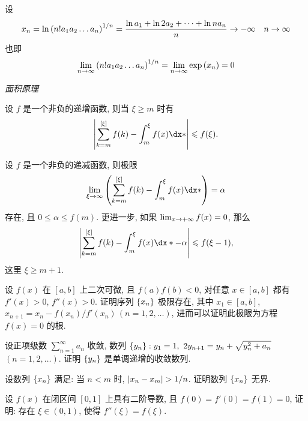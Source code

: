 \begin{exercise}[series=exer]
\begin{answer}
    设 
    \begin{align*}
        x_n = \ln \qty(n! a_{1} a_{2} \dots a_{n})^{1/n} = \frac{\ln{a_1}+\ln{2a_2}+\cdots+\ln{na_n}}{n} \to -\infty \quad n\to \infty
    \end{align*}
    也即
    \begin{align*}
        \lim_{n \to \infty}\qty(n! a_{1} a_{2} \dots a_{n})^{1/n} = \lim_{n \to \infty}\exp{(x_n)} = 0
    \end{align*}
  \end{answer}
  \item \emph{面积原理}
  \begin{exercise}
      \item 设 $ f $ 是一个非负的递增函数, 则当 $ \xi \ge m $ 时有
      \begin{align*}
          \abs{\sum_{k = m}^{[\xi]} f(k) - \int_{m}^{\xi} f(x) \dx*} \le f(\xi).
      \end{align*}
      \item 设 $ f $ 是一个非负的递减函数, 则极限
      \begin{align*}
          \limit{\xi}{\infty} \qty(\sum_{k = m}^{[\xi]} f(k) - \int_{m}^{\xi} f(x) \dx*) = \alpha
      \end{align*}
      存在, 且 $ 0 \le \alpha \le f(m) $. 更进一步, 如果 $ \lim_{x \to +\infty} f(x) = 0 $, 那么
      \begin{align*}
          \abs{\sum_{k = m}^{[\xi]} f(k) - \int_{m}^{\xi} f(x) \dx* - \alpha} \le f(\xi - 1),
      \end{align*}
      这里 $ \xi \ge m + 1 $.
  \end{exercise}
  \item 设 $ f(x) $ 在 $ [a, b] $ 上二次可微, 且 $ f(a)f(b) < 0 $, 对任意 $ x \in [a, b] $ 都有 $ f'(x) > 0 $, $ f''(x) > 0 $. 证明序列 $ \qty{x_{n}} $ 极限存在, 其中 $ x_{1} \in [a, b] $, $ x_{n + 1} = x_{n} - f(x_{n})/f'(x_{n})\,(n = 1, 2, \dots) $, 进而可以证明此极限为方程 $ f(x) = 0 $ 的根.
  \item 设正项级数 $ \sum_{n = 1}^{\infty} a_{n} $ 收敛, 数列 $ \qty{y_{n}} : y_{1} = 1,\ 2y_{n + 1} = y_{n} + \sqrt{y_{n}^{2} + a_{n}} $\, $ (n = 1, 2, \dots) $. 证明 $ \qty{y_{n}} $ 是单调递增的收敛数列.
  \item 设数列 $ \qty{x_{n}} $ 满足: 当 $ n < m $ 时, $ \abs{x_{n} - x_{m}} > 1/n $. 证明数列 $ \qty{x_{n}} $ 无界.
  \item 设 $ f(x) $ 在闭区间 $ [0, 1] $ 上具有二阶导数, 且 $ f(0) = f'(0) = f(1) = 0 $, 证明: 存在 $ \xi \in (0, 1) $, 使得 $ f''(\xi) = f(\xi) $.
  \begin{hint}

\end{hint}
\end{exercise}
